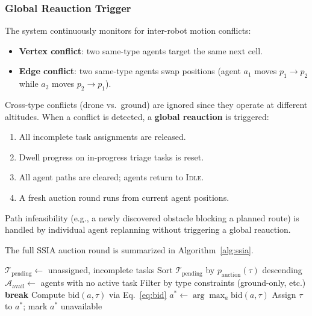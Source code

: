 \documentclass[conference]{IEEEtran}
\begin{document}
\subsubsection{Global Reauction Trigger}
The system continuously monitors for inter-robot motion conflicts:
\begin{itemize}
    \item \textbf{Vertex conflict}: two same-type agents target the same next cell.
    \item \textbf{Edge conflict}: two same-type agents swap positions (agent $a_1$ moves $p_1 \to p_2$ while $a_2$ moves $p_2 \to p_1$).
\end{itemize}
Cross-type conflicts (drone vs.\ ground) are ignored since they operate at different altitudes. When a conflict is detected, a \textbf{global reauction} is triggered:
\begin{enumerate}
    \item All incomplete task assignments are released.
    \item Dwell progress on in-progress triage tasks is reset.
    \item All agent paths are cleared; agents return to \textsc{Idle}.
    \item A fresh auction round runs from current agent positions.
\end{enumerate}
Path infeasibility (e.g., a newly discovered obstacle blocking a planned route) is handled by individual agent replanning without triggering a global reauction.

The full SSIA auction round is summarized in Algorithm~\ref{alg:ssia}.

\begin{algorithm}[t]
\caption{SSIA Auction Round}
\label{alg:ssia}
\begin{algorithmic}[1]
\STATE $\mathcal{T}_{\text{pending}} \gets$ unassigned, incomplete tasks
\STATE Sort $\mathcal{T}_{\text{pending}}$ by $p_{\text{auction}}(\tau)$ descending
    \STATE $\mathcal{A}_{\text{avail}} \gets$ agents with no active task
    \STATE Filter by type constraints (ground-only, etc.)
        \STATE \textbf{break}
    \ENDIF
        \STATE Compute $\text{bid}(a, \tau)$ via Eq.~\ref{eq:bid}
    \ENDFOR
    \STATE $a^* \gets \arg\max_{a} \text{bid}(a, \tau)$
    \STATE Assign $\tau$ to $a^*$; mark $a^*$ unavailable
\ENDFOR
\end{algorithmic}
\end{algorithm}
\end{document}

